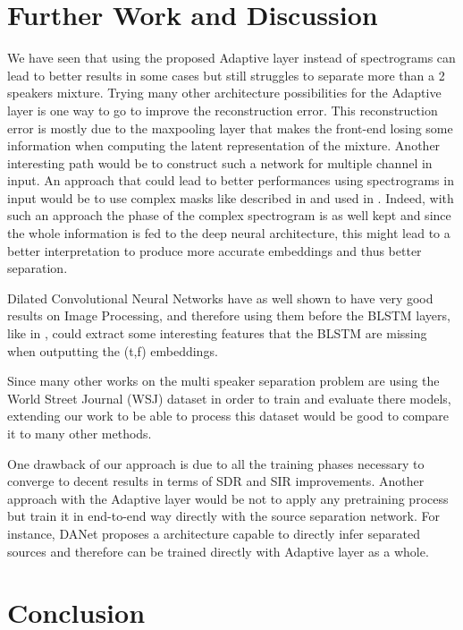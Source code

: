\documentclass[master, tikz, final,11pt, dvipdfmx]{iscs-thesis}
\begin{document}
\chapter{Further Work and Discussion}

We have seen that using the proposed Adaptive layer instead of spectrograms can lead to better results in some cases but still struggles to separate more than a 2 speakers mixture. Trying many other architecture possibilities for the Adaptive layer is one way to go to improve the reconstruction error. This reconstruction error is mostly due to the maxpooling layer that makes the front-end losing some information when computing the latent representation of the mixture.
Another interesting path would be to construct such a network for multiple channel in input.
An approach that could lead to better performances using spectrograms in input would be to use complex masks like described in \cite{OverviewSSDL} and used in \cite{ImageSS}. Indeed, with such an approach the phase of the complex spectrogram is as well kept and since the whole information is fed to the deep neural architecture, this might lead to a better interpretation to produce more accurate embeddings and thus better separation.

Dilated Convolutional Neural Networks have as well shown to have very good results on Image Processing, and therefore using them before the BLSTM layers, like in \cite{ImageSS}, could extract some interesting features that the BLSTM are missing when outputting the (t,f) embeddings.

Since many other works on the multi speaker separation problem are using the World Street Journal (WSJ) dataset in order to train and evaluate there models, extending our work to be able to process this dataset would be good to compare it to many other methods.

One drawback of our approach is due to all the training phases necessary to converge to decent results in terms of SDR and SIR improvements. Another approach with the Adaptive layer would be not to apply any pretraining process but train it in end-to-end way directly with the source separation network. For instance, DANet \cite{DANet} proposes a architecture capable to directly infer separated sources and therefore can be trained directly with Adaptive layer as a whole.

\chapter{Conclusion}
\end{document}
